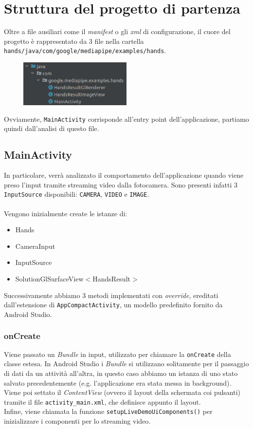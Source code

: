 \section{Struttura del progetto di partenza}
Oltre a file ausiliari come il \textit{manifest} o gli \textit{xml} di configurazione, il cuore del progetto è rappresentato da 3 file nella cartella \texttt{hands/java/com/google/mediapipe/examples/hands}.
\begin{figure}[H]
    \centering
    \includegraphics[width=0.5\textwidth]{images/2.png}
\end{figure}
\noindent Ovviamente, \texttt{MainActivity} corrisponde all'entry point dell'applicazione, partiamo quindi dall'analisi di questo file.

\subsection{MainActivity}
In particolare, verrà analizzato il comportamento dell'applicazione quando viene preso l'input tramite streaming video dalla fotocamera. Sono presenti infatti 3 \texttt{InputSource} disponibili: \texttt{CAMERA}, \texttt{VIDEO} e \texttt{IMAGE}.\\
\\
\noindent Vengono inizialmente create le istanze di:
\begin{itemize}
    \item Hands
    \item CameraInput
    \item InputSource
    \item SolutionGlSurfaceView$<$HandsResult$>$ 
\end{itemize}

\noindent Successivamente abbiamo 3 metodi implementati con \textit{override}, ereditati dall'estensione di \texttt{AppCompactActivity}, un modello predefinito fornito da Android Studio.
\subsubsection{onCreate}
Viene passato un \textit{Bundle} in input, utilizzato per chiamare la \texttt{onCreate} della classe estesa. In Android Studio i \textit{Bundle} si utilizzano solitamente per il passaggio di dati da un attività all'altra, in questo caso abbiamo un istanza di uno stato salvato precedentemente (e.g. l'applicazione era stata messa in background).\\
Viene poi settato il \textit{ContentView} (ovvero il layout della schermata coi pulsanti) tramite il file \texttt{activity\_main.xml}, che definisce appunto il layout.\\
Infine, viene chiamata la funzione \texttt{setupLiveDemoUiComponents()} per inizializzare i componenti per lo streaming video.


